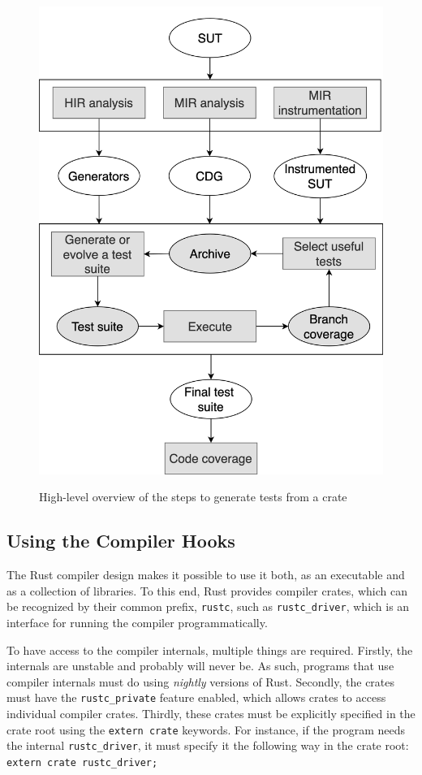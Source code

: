 \documentclass{article}
\begin{document}
\begin{figure}[h!]
\caption{High-level overview of the steps to generate tests from a crate}
\centering
\includegraphics[width=\textwidth]{new-overview}
\label{fig:rustyunit-overview}
\end{figure}



\subsection{Using the Compiler Hooks}
The Rust compiler design makes it possible to use it both, as an executable and as a collection of libraries. To this end, Rust provides compiler crates, which can be recognized by their common prefix, \lstinline{rustc}, such as \lstinline{rustc_driver}, which is an interface for running the compiler programmatically.

To have access to the compiler internals, multiple things are required. Firstly, the internals are unstable and probably will never be. As such, programs that use compiler internals must do using \textit{nightly} versions of Rust. Secondly, the crates must have the \lstinline{rustc_private} feature enabled, which allows crates to access individual compiler crates. Thirdly, these crates must be explicitly specified in the crate root using the \lstinline{extern crate} keywords. For instance, if the program needs the internal \lstinline{rustc_driver}, it must specify it the following way in the crate root: \lstinline{extern crate rustc_driver;}
\end{document}

